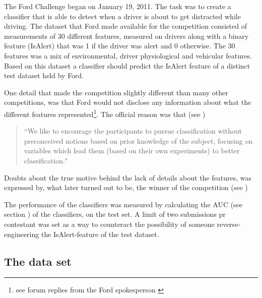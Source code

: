 The Ford Challenge began on January 19, 2011. The task was to create a classifier that is able to detect when a driver is about to get distracted while driving. The dataset that Ford made available for the competition consisted of measurements of 30 different features, measured on drivers along with a binary feature (IsAlert) that was 1 if the driver was alert and 0 otherwise. The 30 features was a mix of environmental, driver physiological and vehicular features. Based on this dataset a classifier should predict the IsAlert feature of a distinct test dataset held by Ford. \par
One detail that made the competition slightly different than many other competitions, was that Ford would not disclose any information about what the different features represented\footnote{see forum replies from the Ford spokesperson \citep{kaggle_forum_266,kaggle_forum_317}}. The official reason was that (see \citep{kaggle_forum_268_reply_2})
\begin{quote}
    ``We like to encourage the participants to pursue classification without preconceived notions based on prior knowledge of the subject, focusing on variables which lead them (based on their own experiments) to better classification."
\end{quote}
Doubts about the true motive behind the lack of details about the features, was expressed by, what later turned out to be, the winner of the competition (see \citep{kaggle_forum_295_reply_3}) \par

The performance of the classifiers was measured by calculating the AUC (see section ) of the classifiers, on the test set. A limit of two submissions pr contestant was set as a way to counteract the possibility of someone reverse-engineering the IsAlert-feature of the test dataset.

\subsection{The data set}


